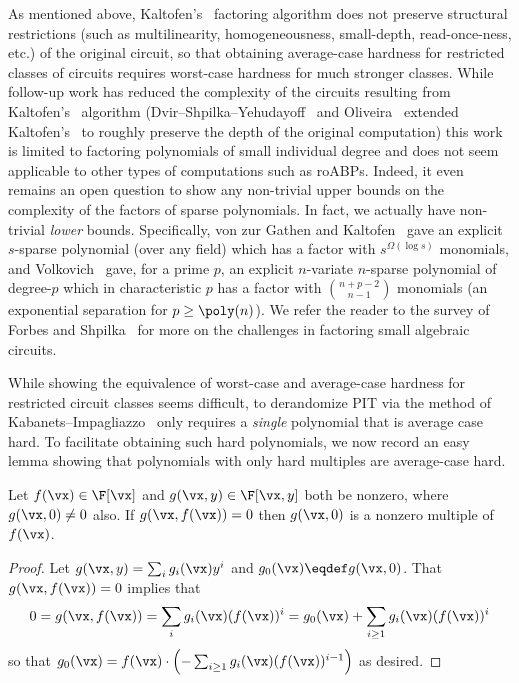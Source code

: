 \documentclass{toc}
\begin{document}
As mentioned above, Kaltofen's~\cite{Kaltofen89} factoring algorithm does not preserve structural restrictions (such as multilinearity, homogeneousness, small-depth, read-once-ness, etc.) of the original circuit, so that obtaining average-case hardness for restricted classes of circuits requires worst-case hardness for much stronger classes.  While follow-up work has reduced the complexity of the circuits resulting from Kaltofen's~\cite{Kaltofen89} algorithm (Dvir--Shpilka--Yehudayoff~\cite{DvirSY09} and Oliveira~\cite{Oliveira15} extended Kaltofen's~\cite{Kaltofen89} to roughly preserve the depth of the original computation) %
this work is  %
limited to factoring polynomials of small individual degree and
%
does  %
not seem applicable to other types of computations such as roABPs. Indeed, it even remains an open question to show any non-trivial upper bounds on the complexity of the factors of sparse polynomials.  In fact, we actually have non-trivial \emph{lower} bounds. Specifically, von zur Gathen and Kaltofen~\cite{vzGathenKaltofen85} gave an explicit $s$-sparse polynomial (over any field) which has a factor with $s^{\Omega(\log s )}$ monomials, and Volkovich~\cite{Volkovich15} gave, for a prime $p$, an explicit $n$-variate $n$-sparse polynomial of degree-$p$ which in characteristic $p$ has a factor with $\binom{n+p-2}{n-1}$ monomials (an exponential separation for $p\ge\poly(n)$). We refer the reader to the survey of Forbes and Shpilka~\cite{ForbesShpilka15} for more on the challenges in factoring small algebraic circuits.

While showing the equivalence of worst-case and average-case hardness for restricted circuit classes seems difficult, to derandomize PIT via the method of Kabanets--Impagliazzo~\cite{KabanetsImpagliazzo04} only requires a \emph{single} polynomial that is average case hard.  To facilitate obtaining such hard polynomials, we now record an easy lemma showing that polynomials with only hard multiples are average-case hard.

\begin{lemma}\label{res:lbs-mult_to_nonroot}
        Let $f(\vx)\in\F[\vx]$ and $g(\vx,y)\in\F[\vx,y]$ both be nonzero, where $g(\vx,0)\ne 0$ also. If $g(\vx,f(\vx))=0$ then $g(\vx,0)$ is a nonzero multiple of $f(\vx)$.
\end{lemma}
\begin{proof}
        Let $g(\vx,y)=\sum_i g_i(\vx)y^i$ and $g_0(\vx)\eqdef g(\vx,0)$.  That $g(\vx,f(\vx))=0$ implies that
        \begin{align*}
                0
                =g(\vx,f(\vx))
                =\sum_i g_i(\vx)(f(\vx))^i
                =g_0(\vx)+\sum_{i\ge 1} g_i(\vx)(f(\vx))^i
        \end{align*}
        so that $g_0(\vx)=f(\vx)\cdot \left(-\sum_{i\ge 1} g_i(\vx)(f(\vx))^{i-1}\right)$ as desired.
\end{proof}
\end{document}
